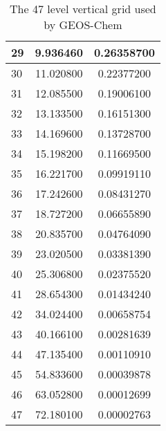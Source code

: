 \begin{table}
\begin{tabular}{|l|c|c|}
    29 & 9.936460 & 0.26358700 
    \\ \hline
    30 & 11.020800 & 0.22377200 
    \\ \hline
    31 & 12.085500 & 0.19006100 
    \\ \hline
    32 & 13.133500 & 0.16151300 
    \\ \hline
    33 & 14.169600 & 0.13728700 
    \\ \hline
    34 & 15.198200 & 0.11669500 
    \\ \hline
    35 & 16.221700 & 0.09919110 
    \\ \hline
    36 & 17.242600 & 0.08431270 
    \\ \hline
    37 & 18.727200 & 0.06655890 
    \\ \hline
    38 & 20.835700 & 0.04764090 
    \\ \hline
    39 & 23.020500 & 0.03381390 
    \\ \hline
    40 & 25.306800 & 0.02375520 
    \\ \hline
    41 & 28.654300 & 0.01434240 
    \\ \hline
    42 & 34.024400 & 0.00658754 
    \\ \hline
    43 & 40.166100 & 0.00281639 
    \\ \hline
    44 & 47.135400 & 0.00110910 
    \\ \hline
    45 & 54.833600 & 0.00039878 
    \\ \hline
    46 & 63.052800 & 0.00012699 
    \\ \hline
    47 & 72.180100 & 0.00002763 
    \\ \hline
  \end{tabular}
  \caption{The 47 level vertical grid used by GEOS-Chem}
  \label{app_a:tab:gc_47_vgrid}
\end{table}